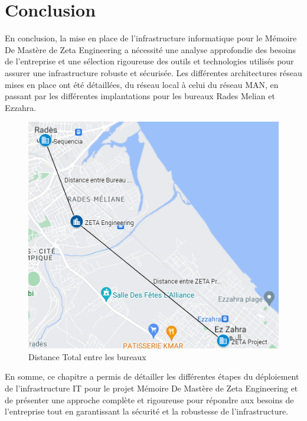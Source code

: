 \section{Conclusion}

En conclusion, la mise en place de l'infrastructure informatique pour le Mémoire De Mastère de Zeta Engineering a nécessité une analyse approfondie des besoins de l'entreprise et une sélection rigoureuse des outils et technologies utilisés pour assurer une infrastructure robuste et sécurisée. Les différentes architectures réseau mises en place ont été détaillées, du réseau local à celui du réseau MAN, en passant par les différentes implantations pour les bureaux Rades Melian et Ezzahra. \\

\begin{figure}[H]
 \centering
    \includegraphics[width=13cm]{Images/DistanceTotal.png}
    \caption{Distance Total entre les bureaux}
    \label{Chap2.6.0}
\end{figure}    
\smallskip

En somme, ce chapitre a permis de détailler les différentes étapes du déploiement de l'infrastructure IT pour le projet Mémoire De Mastère de Zeta Engineering et de présenter une approche complète et rigoureuse pour répondre aux besoins de l'entreprise tout en garantissant la sécurité et la robustesse de l'infrastructure.  \\


